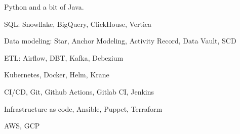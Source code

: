 \item Python and a bit of Java.
\item SQL: Snowflake, BigQuery, ClickHouse, Vertica
\item Data modeling: Star, Anchor Modeling, Activity Record, Data Vault, SCD
\item ETL: Airflow, DBT, Kafka, Debezium
\item Kubernetes, Docker, Helm, Krane
\item CI/CD, Git, Github Actions, Gitlab CI, Jenkins
\item Infrastructure as code, Ansible, Puppet, Terraform
\item AWS, GCP

